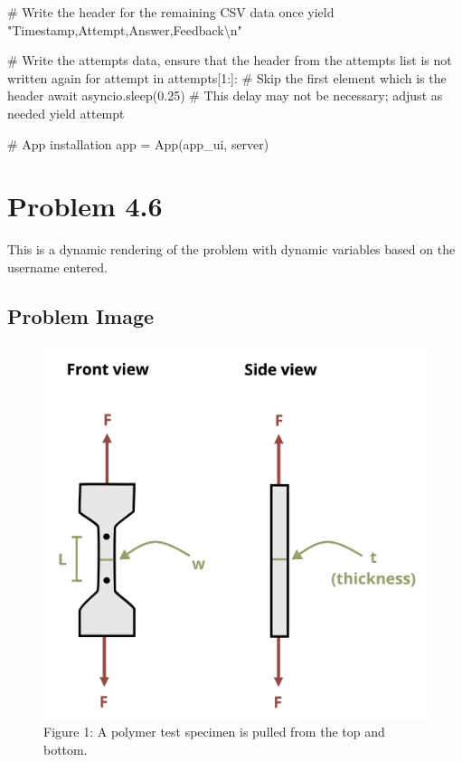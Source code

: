 \documentclass[
  letterpaper,
  DIV=11,
  numbers=noendperiod]{scrreprt}
\newenvironment{Shaded}{\begin{snugshade}}{\end{snugshade}}
\newcommand{\NormalTok}[1]{\textcolor[rgb]{0.00,0.23,0.31}{#1}}
\begin{document}
\begin{Shaded}
\begin{Highlighting}[]
\NormalTok{        \# Write the header for the remaining CSV data once}
\NormalTok{        yield "Timestamp,Attempt,Answer,Feedback\textbackslash{}n"}
        
\NormalTok{        \# Write the attempts data, ensure that the header from the attempts list is not written again}
\NormalTok{        for attempt in attempts[1:]:  \# Skip the first element which is the header}
\NormalTok{            await asyncio.sleep(0.25)  \# This delay may not be necessary; adjust as needed}
\NormalTok{            yield attempt}


\NormalTok{\# App installation}
\NormalTok{app = App(app\_ui, server)}
\end{Highlighting}
\end{Shaded}

\chapter*{Problem 4.6}\label{problem-4.6}


This is a dynamic rendering of the problem with dynamic variables based
on the username entered.

\section*{Problem Image}\label{problem-image-22}


\begin{figure}[H]

{\centering \includegraphics{images/194.png}

}

\caption{Figure 1: A polymer test specimen is pulled from the top and
bottom.}

\end{figure}%
\end{document}
